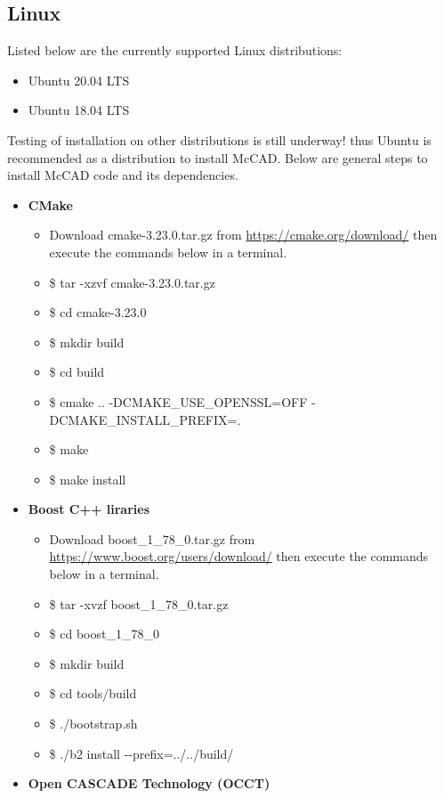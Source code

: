 \documentclass[12pt, a4paper, titlepage]{article}
\begin{document}
  \subsection{Linux}
    Listed below are the currently supported Linux distributions:
    \begin{itemize}
  	  \item Ubuntu 20.04 LTS
  	  \item Ubuntu 18.04 LTS
    \end{itemize} 
    Testing of installation on other distributions is still underway! thus Ubuntu is recommended as a distribution to install McCAD. Below are general steps to install McCAD code and its dependencies.
    \begin{itemize}
  	  \item \textbf{CMake}
  	  \begin{itemize}
		\item Download cmake-3.23.0.tar.gz from \url{https://cmake.org/download/} then execute the commands below in a terminal.
		\item \$ tar -xzvf cmake-3.23.0.tar.gz
		\item \$ cd cmake-3.23.0
		\item \$ mkdir build
		\item \$ cd build
		\item \$ cmake .. -DCMAKE\_USE\_OPENSSL=OFF -DCMAKE\_INSTALL\_PREFIX=.
		\item \$ make
		\item \$ make install
  	  \end{itemize}
      \item \textbf{Boost C++ liraries}
      \begin{itemize}
    	\item Download boost\_1\_78\_0.tar.gz from \url{https://www.boost.org/users/download/} then execute the commands below in a terminal.
    	\item \$ tar -xvzf boost\_1\_78\_0.tar.gz
    	\item \$ cd boost\_1\_78\_0
    	\item \$ mkdir build
    	\item \$ cd tools/build
    	\item \$ ./bootstrap.sh
    	\item \$ ./b2 install -\--prefix=../../build/
      \end{itemize}
      \item \textbf{Open CASCADE Technology (OCCT)}
      \begin{itemize}

\end{itemize}
\end{itemize}
\end{document}
